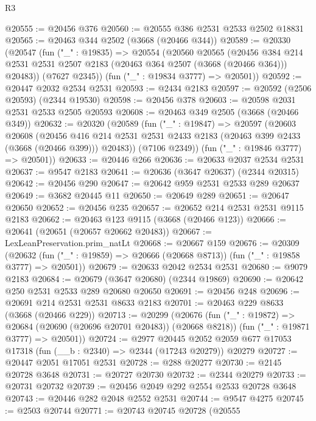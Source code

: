 \begin{lexlean}{R3}
\begin{coremodule}
@20555 := @20456 @376
@20560 := @20555 @386 @2531 @2533 @2502 @18831
@20565 := @20463 @344 @2502 (@3668 (@20466 @344))
@20589 := @20330
    (@20547
      (fun ("_" : @19835) =>
      @20554
        (@20560
          @20565
          (@20456
            @384
            @214
            @2531
            @2531
            @2507
            @2183
            (@20463 @364 @2507 (@3668 (@20466 @364)))
            @20483))
        (@7627 @2345))
      (fun ("_" : @19834 @3777) => @20501))
@20592 := @20447 @2032 @2534 @2531
@20593 := @2434 @2183
@20597 := @20592 (@2506 @20593) (@2344 @19530)
@20598 := @20456 @378
@20603 := @20598 @2031 @2531 @2533 @2505 @20593
@20608 := @20463 @349 @2505 (@3668 (@20466 @349))
@20632 := @20320
    (@20589
      (fun ("_" : @19847) =>
      @20597
        (@20603
          @20608
          (@20456
            @416
            @214
            @2531
            @2531
            @2433
            @2183
            (@20463 @399 @2433 (@3668 (@20466 @399)))
            @20483))
        (@7106 @2349))
      (fun ("_" : @19846 @3777) => @20501))
@20633 := @20446 @266
@20636 := @20633 @2037 @2534 @2531
@20637 := @9547 @2183
@20641 := @20636 (@3647 @20637) (@2344 @20315)
@20642 := @20456 @290
@20647 := @20642 @959 @2531 @2533 @289 @20637
@20649 := @3682 @20445 @11
@20650 := @20649 @289
@20651 := @20647 @20650
@20652 := @20456 @235
@20657 := @20652 @214 @2531 @2531 @9115 @2183
@20662 := @20463 @123 @9115 (@3668 (@20466 @123))
@20666 := @20641 (@20651 (@20657 @20662 @20483))
@20667 := LexLeanPreservation.prim_natLt
@20668 := @20667 @159
@20676 := @20309
    (@20632 (fun ("_" : @19859) => @20666 (@20668 @8713)) (fun ("_" : @19858 @3777) => @20501))
@20679 := @20633 @2042 @2534 @2531
@20680 := @9079 @2183
@20684 := @20679 (@3647 @20680) (@2344 @19869)
@20690 := @20642 @250 @2531 @2533 @289 @20680 @20650
@20691 := @20456 @248
@20696 := @20691 @214 @2531 @2531 @8633 @2183
@20701 := @20463 @229 @8633 (@3668 (@20466 @229))
@20713 := @20299
    (@20676
      (fun ("_" : @19872) => @20684 (@20690 (@20696 @20701 @20483)) (@20668 @8218))
      (fun ("_" : @19871 @3777) => @20501))
@20724 := @2977
    @20445
    @2052
    @2059
    @677
    @17053
    @17318
    (fun (__b : @2340) => @2344 (@17243 @20279))
    @20279
@20727 := @20447 @2051 @17051 @2531
@20728 := @288 @20277
@20730 := @2145 @20728 @3648
@20731 := @20727 @20730
@20732 := @2344 @20279
@20733 := @20731 @20732
@20739 := @20456 @2049 @292 @2554 @2533 @20728 @3648
@20743 := @20446 @282 @2048 @2552 @2531
@20744 := @9547 @4275
@20745 := @2503 @20744
@20771 := @20743
    @20745
    @20728
    (@20555

\end{coremodule}
\end{lexlean}
